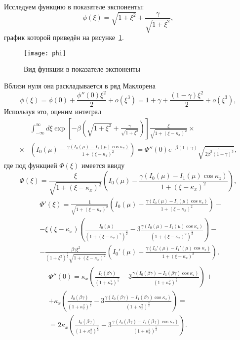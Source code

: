 Исследуем функцию в показателе экспоненты:
\begin{equation*}
    \phi(\xi) = \sqrt{1+\xi^2} + \frac{\gamma}{\sqrt{1+\xi^2}},
\end{equation*}
график которой приведён на рисунке~\ref{fig:phi}.
\begin{figure}[ht]
    \center
    \texttt{[image: phi]}
    \caption{Вид функции в показателе экспоненты}
    \label{fig:phi}
\end{figure}
Вблизи нуля она раскладывается в ряд Маклорена
\begin{equation*}
    \phi(\xi) = \phi(0) + \frac{\phi''(0)\xi^2}{2} + o(\xi^3) = 1+\gamma
    +\frac{(1-\gamma)\xi^2}{2} + o(\xi^3),
\end{equation*}
Используя это, оценим интеграл
\begin{align*}
    & \int_{-\infty}^\infty d\xi \exp\left[-\beta\left(\sqrt{1+\xi^2} +
    \frac{\gamma}{\sqrt{1+\xi^2}}\right)\right]
    \frac{\xi}{\sqrt{1 + (\xi-\kappa_x)^2}}\times\\\times&\left( I_0(\mu) -
    \frac{\gamma(I_0(\mu)-I_1(\mu)\cos\kappa_z)}{1 + (\xi-\kappa_x)^2}\right)=
    \Phi''(0)e^{-\beta(1+\gamma)}\sqrt{\frac{\pi}{2\beta^3(1-\gamma)^3}},
\end{align*}
где под функцией \( \Phi(\xi) \) имеется ввиду
\begin{equation*}
    \Phi(\xi) = \frac{\xi}{\sqrt{1 + (\xi-\kappa_x)^2}}\left( I_0(\mu) -
    \frac{\gamma(I_0(\mu)-I_1(\mu)\cos\kappa_z)}{1 + (\xi-\kappa_x)^2}\right),
\end{equation*}
\begin{align*}
    &\Phi'(\xi) = \frac{1}{\sqrt{1 + (\xi-\kappa_x)^2}}\left( I_0(\mu) -
    \frac{\gamma(I_0(\mu)-I_1(\mu)\cos\kappa_z)}{1 +(\xi-\kappa_x)^2}\right)-
    \\&-\xi(\xi-\kappa_x)\left(\frac{I_0(\mu)}{(1+(\xi-\kappa_x)^2)^\frac{3}{2}}-3
    \frac{\gamma(I_0(\mu)-I_1(\mu)\cos\kappa_z)}{(1 +
(\xi-\kappa_x)^2)^\frac{5}{2}}\right)-\\&-\frac{\beta\gamma\xi^2}{(1+\xi^2)^\frac{3}{2}\sqrt{1 + (\xi-\kappa_x)^2}}
\left( I_0'(\mu) - \frac{\gamma(I_0'(\mu)-I_1'(\mu)\cos\kappa_z)}{1
+(\xi-\kappa_x)^2}\right),
\end{align*}
\begin{align*}
    &\Phi''(0) = \kappa_x\left(\frac{I_0(\beta\gamma)}{(1+\kappa_x^2)^\frac{3}{2}}-3
    \frac{\gamma(I_0(\beta\gamma)-I_1(\beta\gamma)\cos\kappa_z)}{(1 + \kappa_x^2)^\frac{5}{2}}\right)+
    \\&+\kappa_x\left(\frac{I_0(\beta\gamma)}{(1+\kappa_x^2)^\frac{3}{2}}-3
    \frac{\gamma(I_0(\beta\gamma)-I_1(\beta\gamma)\cos\kappa_z)}{(1
    +\kappa_x^2)^\frac{5}{2}}\right)=\\
    &=2\kappa_x\left(\frac{I_0(\beta\gamma)}{(1+\kappa_x^2)^\frac{3}{2}}-3
    \frac{\gamma(I_0(\beta\gamma)-I_1(\beta\gamma)\cos\kappa_z)}{(1 +
    \kappa_x^2)^\frac{5}{2}}\right).
\end{align*}
